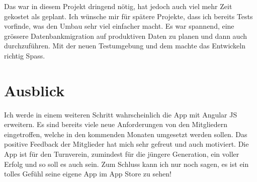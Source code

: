Das  war in diesem Projekt dringend nötig, hat jedoch auch viel mehr Zeit gekostet als geplant. Ich wünsche mir für spätere Projekte, dass ich bereits Tests vorfinde, was den Umbau sehr viel einfacher macht. Es war spannend, eine grössere Datenbankmigration auf produktiven Daten zu planen und dann auch durchzuführen. Mit der neuen Testumgebung und dem  machte das Entwickeln richtig Spass.\\

\section{Ausblick}\label{fazit_ausblick}
Ich werde in einem weiteren Schritt wahrscheinlich die App mit Angular JS erweitern. Es sind bereits viele neue Anforderungen von den Mitgliedern eingetroffen, welche in den kommenden Monaten umgesetzt werden sollen. Das positive Feedback der Mitglieder hat mich sehr gefreut und auch motiviert. Die App ist für den Turnverein, zumindest für die jüngere Generation, ein voller Erfolg und so soll es auch sein. Zum Schluss kann ich nur noch sagen, es ist ein tolles Gefühl seine eigene App im App Store zu sehen!